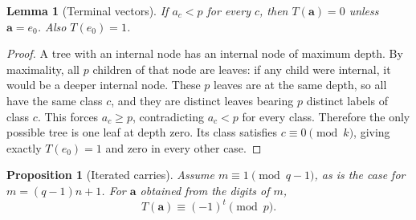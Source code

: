 \documentclass[11pt]{amsart}
\newtheorem{lemma}[theorem]{Lemma}
\newtheorem{proposition}[theorem]{Proposition}
\theoremstyle{definition}
\theoremstyle{remark}
\begin{document}
\begin{lemma}[Terminal vectors]\label{lem:terminal}
If $a_c<p$ for every $c$, then $T(\mathbf a)=0$ unless $\mathbf a=e_0$.  Also $T(e_0)=1$.
\end{lemma}
\begin{proof}
A tree with an internal node has an internal node of maximum depth.  By maximality, all $p$ children of that node are leaves: if any child were internal, it would be a deeper internal node.  These $p$ leaves are at the same depth, so all have the same class $c$, and they are distinct leaves bearing $p$ distinct labels of class $c$.  This forces $a_c\ge p$, contradicting $a_c<p$ for every class.  Therefore the only possible tree is one leaf at depth zero.  Its class satisfies $c\equiv0\pmod k$, giving exactly $T(e_0)=1$ and zero in every other case.
\end{proof}
\begin{proposition}[Iterated carries]\label{prop:carry-termination}
Assume $m\equiv1\pmod{q-1}$, as is the case for $m=(q-1)n+1$.  For $\mathbf a$ obtained from the digits of $m$,
\[
 T(\mathbf a)\equiv(-1)^t\pmod p.
\]
\end{proposition}
\end{document}
